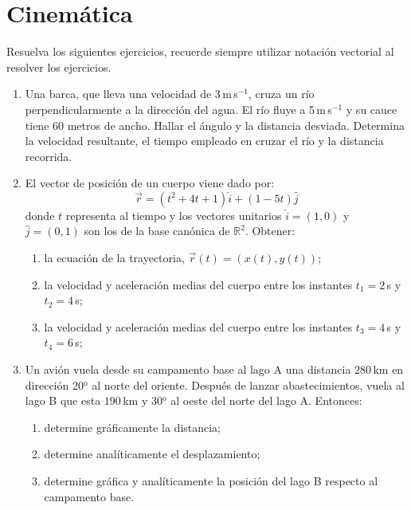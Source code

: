 \documentclass[a4paper,12pt]{article}
\begin{document}
\section*{Cinemática}

Resuelva los siguientes ejercicios, recuerde siempre utilizar notación vectorial al resolver los ejercicios.

\begin{enumerate}
\item Una barca, que lleva una velocidad de 3\,m\,s$^{-1}$, cruza un río perpendicularmente a la dirección del agua. El río fluye a 5\,m\,s$^{-1}$ y su cauce tiene 60 metros de ancho. Hallar el ángulo y la distancia desviada. Determina la velocidad resultante, el tiempo empleado en cruzar el río y la distancia recorrida.

\item El vector de posición de un cuerpo viene dado por:
  \begin{equation}
    \vec{r} = (t^{2}+4t+1)\hat{i} + (1-5t)\hat{j}
  \end{equation}
  donde $t$ representa al tiempo y los vectores unitarios $\hat{i}=(1,0)$ y $\hat{j}=(0,1)$ son los de la base canónica de $\mathbb{R}^2$. Obtener:
  \begin{enumerate}
    \item la ecuación de la trayectoria, $\vec r(t) = \left ( x(t), y(t) \right )$;
    \item la velocidad y aceleración medias del cuerpo entre los instantes $t_{1} = 2$\,s y $t_{2} = 4$\,s;
    \item la velocidad y aceleración medias del cuerpo entre los instantes $t_{3}=4$\,s y $t_{4}=6$\,s;
  \end{enumerate}
  
\item Un avión vuela desde su campamento base al lago A una distancia $280$\,km en dirección 20$^{\mathrm{o}}$ al norte del oriente. Después de lanzar abastecimientos, vuela al lago B que esta $190$\,km y 30$^{\mathrm{o}}$ al oeste del norte del lago A. Entonces:
  \begin{enumerate}
    \item determine gráficamente la distancia;
    \item determine analíticamente el desplazamiento;
    \item determine gráfica y analíticamente la posición del lago B respecto al campamento base.
  \end{enumerate}


\end{enumerate}
\end{document}
